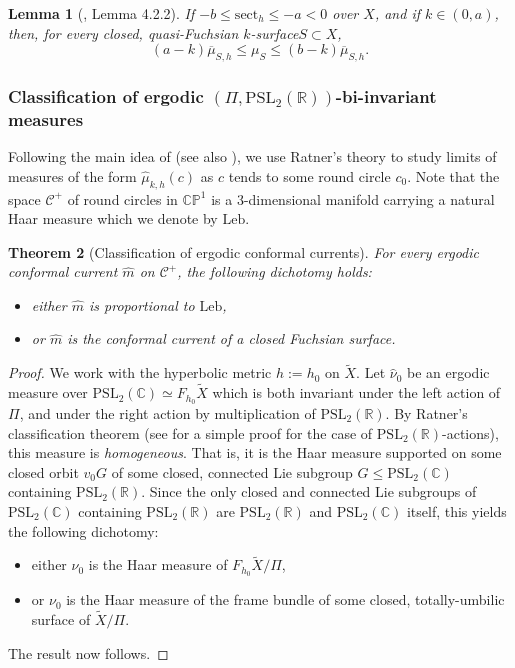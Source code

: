 \documentclass[JEP,XML,SOM,Unicode,NoEqCountersInSection,published]{cedram}
\newcommand{\ksurface}{$k$\nobreakdash-surface\xspace}
\theoremstyle{plain}
\newtheorem{theorem}{Theorem}[section]
\newtheorem{lemma}[theorem]{Lemma}
\theoremstyle{definition}
\newcommand\PSL{\mathrm{PSL}_2(\mathbb{R})}
\newcommand\PSLc{\mathrm{PSL}_2(\mathbb{C})}
\newcommand\CP{\C\PP^1}
\newcommand{\C}{{\mathbb C}}
\newcommand{\PP}{{\mathbb P}}
\newcommand{\cC}{{\mathcal C}}
\let\dans\subset
\newcommand{\Leb}{\mathrm{Leb}}
\newcommand{\sect}{\mathrm{sect}}
\begin{document}
\begin{lemma}[\cite{ALS}, Lemma 4.2.2]\label{lem_comparison_area_laminar}
If $-b\leq \sect_h\leq -a<0$ over $X$, and if $k\in(0,a)$, then, for every closed, quasi-Fuchsian \ksurface $S\dans X$,
\begin{equation*}
(a-k)\overline{\mu}_{S,h}\leq\mu_S\leq(b-k)\overline{\mu}_{S,h}.
\end{equation*}
\end{lemma}

\subsubsection{Classification of ergodic $(\Pi,\PSL)$-bi-invariant measures}

Following the main idea of \cite{CMN} (see also \cite{LabourieBourbaki}), we use Ratner's theory to study limits of measures of the form $\hat\mu_{k,h}(c)$ as $c$ tends to some round circle $c_0$. Note that the space $\cC^+$ of round circles in $\CP$ is a $3$\nobreakdash-dimensional manifold carrying a natural Haar measure which we denote by $\Leb$.

\begin{theorem}[Classification of ergodic conformal currents]
\label{thm.Ratner} For every ergodic conformal current $\hat m$ on $\cC^+$, the following dichotomy holds:
\begin{itemize}
\item either $\hat m$ is proportional to $\Leb$,
\item or $\hat m$ is the conformal current of a closed Fuchsian surface.
\end{itemize}
\end{theorem}

\begin{proof}
We work with the hyperbolic metric $h:=h_0$ on $\tilde{X}$. Let $\hat\nu_0$ be an ergodic measure over $\PSLc\simeq F_{h_0}\tilde{X}$ which is both invariant under the left action of $\Pi$, and under the right action by multiplication of $\PSL$. By Ratner's classification theorem \cite{Ratner_Duke} (see \cite{Einsiedler} for a simple proof for the case of $\PSL$-actions), this measure is \emph{homogeneous}. That is, it is the Haar measure supported on some closed orbit $v_0G$ of some closed, connected Lie subgroup $G\leq\PSLc$ containing $\PSL$. Since the only closed and connected Lie subgroups of $\PSLc$ containing $\PSL$ are $\PSL$ and $\PSLc$ itself, this yields the following dichotomy:
\begin{itemize}
\item either $\nu_0$ is the Haar measure of $F_{h_0}\tilde X/\Pi$,
\item or $\nu_0$ is the Haar measure of the frame bundle of some closed, totally-umbilic surface of $\tilde X/\Pi$.
\end{itemize}
The result now follows.
\end{proof}
\end{document}
